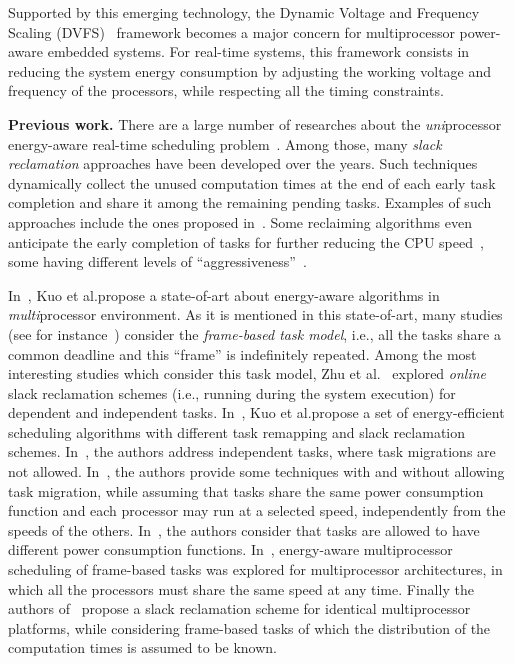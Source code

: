 \documentclass[times, 10pt,twocolumn]{article}
\begin{document}
Supported by this emerging technology, the Dynamic Voltage and Frequency Scaling (DVFS)~\cite{Chen:07} framework becomes a major concern for multiprocessor power-aware embedded systems. For real-time systems, this framework consists in reducing the system energy consumption by adjusting the working voltage and frequency of the processors, while respecting all the timing constraints. 


\textbf{Previous work.} There are a large number of researches about the \emph{uni}processor energy-aware real-time scheduling problem~\cite{AyMeMoMe:04,Bansal:04,Irani:03,IsYa:98,YaDeSh:95}. Among those, many \emph{slack reclamation} approaches have been developed over the years. Such techniques dynamically collect the unused computation times at the end of each early task completion and share it among the remaining pending tasks. Examples of such approaches include the ones proposed in~\cite{AyMeMoMe:04,pillai01,ShCh:99,ZhCh:02}. Some reclaiming algorithms even anticipate the early completion of tasks for further reducing the CPU speed~\cite{AyMeMoMe:04,pillai01}, some having different levels of ``aggressiveness''~\cite{AyMeMoMe:04}.

In~\cite{Chen:07}, Kuo et al.\@ propose a state-of-art about energy-aware algorithms in \emph{multi}processor environment. As it is mentioned in this state-of-art, many studies (see for instance~\cite{ChHsChYaPaKu:04,ChenKuo:05,Kuo:06,ChenKuo:06,ZhuMelhemChilders:01,YangChenKuo:05}) consider the \emph{frame-based task model}, i.e., all the tasks share a common deadline and this ``frame'' is indefinitely repeated. Among the most interesting studies which consider this task model, Zhu et al.\@~\cite{ZhuMelhemChilders:01} explored \emph{online} slack reclamation schemes (i.e., running during the system execution) for dependent and independent tasks. In~\cite{ChenKuo:06}, Kuo et al.\@ propose a set of energy-efficient scheduling algorithms with different task remapping and slack reclamation schemes. In~\cite{Kuo:06}, the authors address independent tasks, where task migrations are not allowed. In~\cite{ChHsChYaPaKu:04}, the authors provide some techniques with and without allowing task migration, while assuming that tasks share the same power consumption function and each processor may run at a selected speed, independently from the speeds of the others. In~\cite{ChenKuo:05}, the authors consider that tasks are allowed to have different power consumption functions. In~\cite{YangChenKuo:05}, energy-aware multiprocessor scheduling of frame-based tasks was explored for multiprocessor architectures, in which all the processors must share the same speed at any time. Finally the authors of~\cite{BertenGoossens:08} propose a slack reclamation scheme for identical multiprocessor platforms, while considering frame-based tasks of which the distribution of the computation times is assumed to be known.
\end{document}
